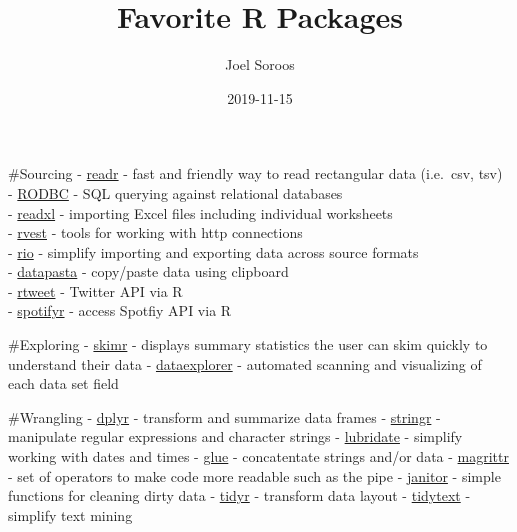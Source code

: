 \documentclass[
]{article}
\title{Favorite R Packages}
\author{Joel Soroos}
\date{2019-11-15}
\begin{document}
\maketitle

\#Sourcing - \href{https://readr.tidyverse.org/}{readr} - fast and
friendly way to read rectangular data (i.e.~csv, tsv)\\
-
\href{https://cran.r-project.org/web/packages/RODBC/vignettes/RODBC.pdf}{RODBC}
- SQL querying against relational databases\\
-
\href{https://tutorials.methodsconsultants.com/posts/reading-and-writing-excel-files-with-r-using-readxl-and-writexl/}{readxl}
- importing Excel files including individual worksheets\\
- \href{https://github.com/tidyverse/rvest/blob/master/README.md}{rvest}
- tools for working with http connections\\
-
\href{https://cran.r-project.org/web/packages/rio/vignettes/rio.html}{rio}
- simplify importing and exporting data across source formats\\
-
\href{https://cran.r-project.org/web/packages/datapasta/vignettes/how-to-datapasta.html}{datapasta}
- copy/paste data using clipboard\\
-
\href{https://cran.r-project.org/web/packages/rtweet/vignettes/intro.html}{rtweet}
- Twitter API via R\\
-
\href{https://rpubs.com/womeimingzi11/how_my_spotify_looks_like}{spotifyr}
- access Spotfiy API via R

\#Exploring -
\href{https://www.rdocumentation.org/packages/skimr/versions/2.1}{skimr}
- displays summary statistics the user can skim quickly to understand
their data -
\href{https://www.rdocumentation.org/packages/DataExplorer/versions/0.8.0}{dataexplorer}
- automated scanning and visualizing of each data set field

\#Wrangling -
\href{http://genomicsclass.github.io/book/pages/dplyr_tutorial.html}{dplyr}
- transform and summarize data frames -
\href{https://stringr.tidyverse.org/}{stringr} - manipulate regular
expressions and character strings -
\href{https://lubridate.tidyverse.org/}{lubridate} - simplify working
with dates and times - \href{https://github.com/tidyverse/glue}{glue} -
concatentate strings and/or data -
\href{https://magrittr.tidyverse.org/}{magrittr} - set of operators to
make code more readable such as the pipe -
\href{https://garthtarr.github.io/meatR/janitor.html}{janitor} - simple
functions for cleaning dirty data -
\href{https://tidyr.tidyverse.org/}{tidyr} - transform data layout -
\href{https://cran.r-project.org/web/packages/tidytext/vignettes/tidytext.html}{tidytext}
- simplify text mining
\end{document}
